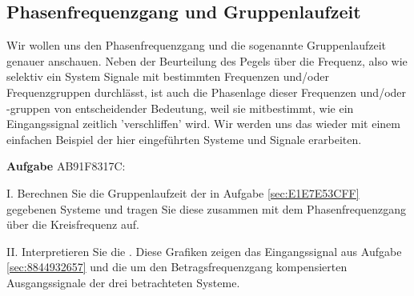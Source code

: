 \subsection{Phasenfrequenzgang und Gruppenlaufzeit}
\label{sec:AB91F8317C}
\begin{Ziel}
Wir wollen uns den Phasenfrequenzgang und die sogenannte Gruppenlaufzeit
genauer anschauen. Neben der Beurteilung des Pegels über die Frequenz,
also wie selektiv ein System Signale mit bestimmten Frequenzen und/oder
Frequenzgruppen durchlässt, ist auch die Phasenlage dieser Frequenzen und/oder
-gruppen von entscheidender Bedeutung, weil sie mitbestimmt, wie ein Eingangssignal
zeitlich 'verschliffen' wird.
Wir werden uns das wieder mit einem einfachen Beispiel der hier eingeführten
Systeme und Signale erarbeiten.
\end{Ziel}
\textbf{Aufgabe} {\tiny AB91F8317C}:

\noindent I. Berechnen Sie die Gruppenlaufzeit
der in Aufgabe \ref{sec:E1E7E53CFF} gegebenen Systeme und
tragen Sie diese zusammen mit dem Phasenfrequenzgang über die Kreisfrequenz auf.

\noindent II. Interpretieren Sie die . Diese Grafiken
zeigen das Eingangssignal aus Aufgabe \ref{sec:8844932657} und die um den
Betragsfrequenzgang kompensierten Ausgangssignale der drei betrachteten
Systeme.

